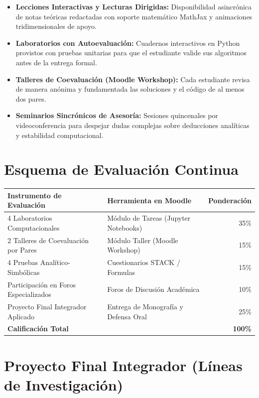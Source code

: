 \documentclass[11pt, a4paper]{article}
\begin{document}
	\begin{itemize}
		\item \textbf{Lecciones Interactivas y Lecturas Dirigidas:} Disponibilidad asincrónica de notas teóricas redactadas con soporte matemático MathJax y animaciones tridimensionales de apoyo.
		\item \textbf{Laboratorios con Autoevaluación:} Cuadernos interactivos en Python provistos con pruebas unitarias para que el estudiante valide sus algoritmos antes de la entrega formal.
		\item \textbf{Talleres de Coevaluación (Moodle Workshop):} Cada estudiante revisa de manera anónima y fundamentada las soluciones y el código de al menos dos pares.
		\item \textbf{Seminarios Sincrónicos de Asesoría:} Sesiones quincenales por videoconferencia para despejar dudas complejas sobre deducciones analíticas y estabilidad computacional.
	\end{itemize}
	
	\section{Esquema de Evaluación Continua}
	
	\begin{center}
		\begin{tabularx}{\textwidth}{lXr}
			\toprule
			\textbf{Instrumento de Evaluación} & \textbf{Herramienta en Moodle} & \textbf{Ponderación} \\
			\midrule
			4 Laboratorios Computacionales & Módulo de Tareas (Jupyter Notebooks) & 35\% \\
			2 Talleres de Coevaluación por Pares & Módulo Taller (Moodle Workshop) & 15\% \\
			4 Pruebas Analítico-Simbólicas & Cuestionarios STACK / Formulas & 15\% \\
			Participación en Foros Especializados & Foros de Discusión Académica & 10\% \\
			Proyecto Final Integrador Aplicado & Entrega de Monografía y Defensa Oral & 25\% \\
			\midrule
			\textbf{Calificación Total} & & \textbf{100\%} \\
			\bottomrule
		\end{tabularx}
	\end{center}
	
	\section{Proyecto Final Integrador (Líneas de Investigación)}
	
\end{document}
